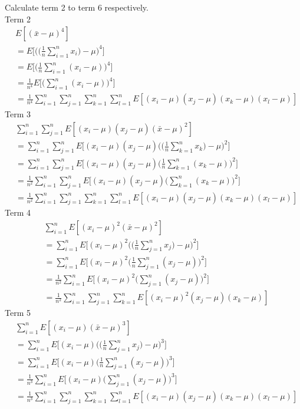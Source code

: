 \documentclass[12pt,a4paper]{report}
\begin{document}
Calculate term 2 to term 6 respectively. \\
Term 2
\begin{align}
& E[(\bar{x} - \mu)^4] \\
&=E \Bigg[ \Bigg( \Bigg( \frac{1}{n} \sum_{i=1}^n x_i \Bigg) - \mu \Bigg)^4 \Bigg] \\
&=E \Bigg[ \Bigg( \frac{1}{n} \sum_{i=1}^n (x_i - \mu) \Bigg)^4 \Bigg] \\
&=\frac{1}{n^4} E \Bigg[ \Bigg(\sum_{i=1}^n (x_i - \mu) \Bigg)^4 \Bigg] \\
&=\frac{1}{n^4} \sum_{i=1}^n \sum_{j=1}^n \sum_{k=1}^n \sum_{l=1}^n E[(x_i - \mu)(x_j - \mu)(x_k - \mu)(x_l - \mu)] \label{proof_variance_term2}
\end{align}
Term 3
\begin{align}
& \sum_{i = 1}^{n} \sum_{j = 1}^{n} E[(x_i - \mu) (x_j - \mu) (\bar{x} - \mu)^2] \\
&=\sum_{i = 1}^{n} \sum_{j = 1}^{n} E\Bigg[ (x_i - \mu) (x_j - \mu) \Bigg( \Bigg( \frac{1}{n} \sum_{k=1}^n x_k \Bigg) - \mu \Bigg)^2 \Bigg] \\
&=\sum_{i = 1}^{n} \sum_{j = 1}^{n} E\Bigg[ (x_i - \mu) (x_j - \mu) \Bigg( \frac{1}{n} \sum_{k=1}^n (x_k - \mu) \Bigg)^2 \Bigg] \\
&=\frac{1}{n^2} \sum_{i = 1}^{n} \sum_{j = 1}^{n} E\Bigg[ (x_i - \mu) (x_j - \mu) \Bigg( \sum_{k=1}^n (x_k - \mu) \Bigg)^2 \Bigg] \\
&=\frac{1}{n^2} \sum_{i=1}^n \sum_{j=1}^n \sum_{k=1}^n \sum_{l=1}^n E[(x_i - \mu)(x_j - \mu)(x_k - \mu)(x_l - \mu)]  \label{proof_variance_term3}
\end{align}
Term 4
\begin{align}
& \sum_{i = 1}^{n} E[(x_i - \mu)^2 (\bar{x} - \mu)^2] \\
&=\sum_{i = 1}^{n} E \Bigg[ (x_i - \mu)^2 \Bigg( \Bigg( \frac{1}{n} \sum_{j=1}^n x_j \Bigg) - \mu \Bigg)^2 \Bigg] \\
&=\sum_{i = 1}^{n} E \Bigg[ (x_i - \mu)^2 \Bigg( \frac{1}{n} \sum_{j=1}^n (x_j - \mu) \Bigg)^2 \Bigg] \\
&=\frac{1}{n^2} \sum_{i = 1}^{n} E \Bigg[ (x_i - \mu)^2 \Bigg( \sum_{j=1}^n (x_j - \mu) \Bigg)^2 \Bigg] \\
&=\frac{1}{n^2} \sum_{i = 1}^{n} \sum_{j = 1}^{n} \sum_{k = 1}^{n} E[ (x_i - \mu)^2 (x_j - \mu) (x_k - \mu) ]  \label{proof_variance_term4}
\end{align}
Term 5
\begin{align}
& \sum_{i = 1}^{n} E[(x_i - \mu) (\bar{x} - \mu)^3] \\
&=\sum_{i = 1}^{n} E \Bigg[(x_i - \mu) \Bigg( \Bigg( \frac{1}{n} \sum_{j=1}^n x_j \Bigg) - \mu \Bigg)^3 \Bigg] \\
&=\sum_{i = 1}^{n} E \Bigg[(x_i - \mu) \Bigg( \frac{1}{n} \sum_{j=1}^n (x_j - \mu) \Bigg)^3 \Bigg] \\
&=\frac{1}{n^3} \sum_{i = 1}^{n} E \Bigg[(x_i - \mu) \Bigg( \sum_{j=1}^n (x_j - \mu) \Bigg)^3 \Bigg] \\
&=\frac{1}{n^3} \sum_{i=1}^n \sum_{j=1}^n \sum_{k=1}^n \sum_{l=1}^n E[(x_i - \mu)(x_j - \mu)(x_k - \mu)(x_l - \mu)]  \label{proof_variance_term5}
\end{align}
\end{document}
